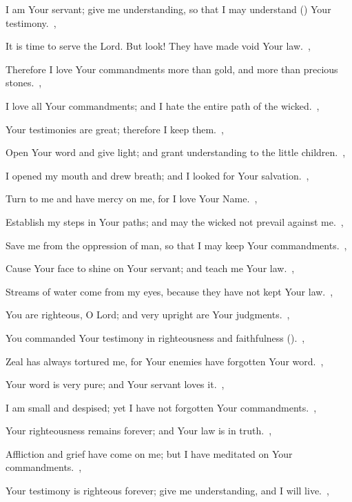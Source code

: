 \documentclass[12pt,twoside,a5paper]{article}
\begin{document}
\begin{normalparskip}
  I am Your servant; give me understanding, so that I may understand () Your testimony.~\sep

  It is time to serve the Lord. But look! They have made void Your law.~\sep

  Therefore I love Your commandments more than gold, and more than precious stones.~\sep

  I love all Your commandments; and I hate the entire path of the wicked.~\sep

   Your testimonies are great; therefore I keep them.~\sep


  Open Your word and give light; and grant understanding to the little children.~\sep

  I opened my mouth and drew breath; and I looked for Your salvation.~\sep

  Turn to me and have mercy on me, for I love Your Name.~\sep

  Establish my steps in Your paths; and may the wicked not prevail against me.~\sep

  Save me from the oppression of man, so that I may keep Your commandments.~\sep

  Cause Your face to shine on Your servant; and teach me Your law.~\sep

  Streams of water come from my eyes, because they have not kept Your law.~\sep

   You are righteous, O Lord; and very upright are Your judgments.~\sep


  You commanded Your testimony in righteousness and faithfulness ().~\sep

  Zeal has always tortured me, for Your enemies have forgotten Your word.~\sep

  Your word is very pure; and Your servant loves it.~\sep

  I am small and despised; yet I have not forgotten Your commandments.~\sep

  Your righteousness remains forever; and Your law is in truth.~\sep

  Affliction and grief have come on me; but I have meditated on Your commandments.~\sep

  Your testimony is righteous forever; give me understanding, and I will live.~\sep


\end{normalparskip}
\end{document}
